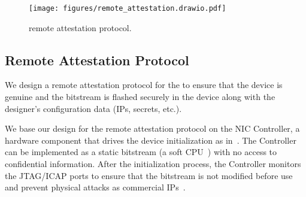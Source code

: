 


\begin{figure}[t!]
    \centering
    \texttt{[image: figures/remote\_attestation.drawio.pdf]}
    \caption{\trustednic{} remote attestation protocol.}
    \label{fig:remote_attestation}
\end{figure}

\subsection{Remote Attestation Protocol} 
\label{subsec:nic_controller}
We design a remote attestation protocol for the \projecttitle{} to ensure that the \projecttitle{} device is genuine and the \projecttitle{} bitstream is flashed securely in the device along with the designer's configuration data (IPs, secrets, etc.).

 We base our design for the remote attestation protocol on the NIC Controller, a hardware component that drives the device initialization as in~\cite{10.1145/3503222.3507733}. The Controller can be implemented as a static bitstream (a soft CPU~\cite{microblaze, nios, 10.1145/3503222.3507733}) with no access to confidential information. After the initialization process, the Controller monitors the JTAG/ICAP ports to ensure that the bitstream is not modified before use and prevent physical attacks as commercial IPs~\cite{secMon}.







